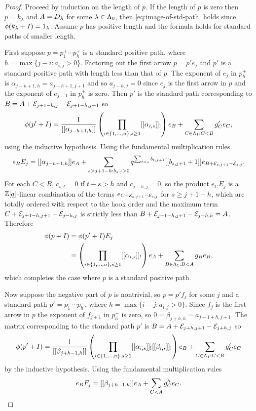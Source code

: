 \documentclass[a4paper, 11pt]{report}
\begin{document}
\begin{proof}
Proceed by induction on the length of $p$. If the length of $p$ is zero then $p=k_\lambda$ and $A=D_{\lambda}$ for some $\lambda\in\Lambda_0{}$, then \ref{eq:image-of-std-path} holds since $\phi(k_\lambda +I)=1_\lambda$. Assume $p$ has positive length and the formula holds for standard paths of smaller length.

First suppose $p=p_1^+\cdots p_h^+$ is a standard positive path, where $h=\max\{j-i:a_{i,j}>0\}$. Factoring out the first arrow $p=p'e_j$ and $p'$ is a standard positive path with length less than that of $p$. The exponent of $e_j$ in $p_h^+$ is $\alpha_{j-h+1,h}=a_{j-h+1,j+1}$ and so $a_{j-h,j}=0$ since $e_j$ is the first arrow in $p$ and the exponent of $e_{j-1}$ in $p_h^+$ is zero. Then $p'$ is the standard path corresponding to $B=A+\mathcal{E}_{j+1-h,j}-\mathcal{E}_{j+1-h,j+1}$ so
\begin{equation*}
\phi(p'+I) = \frac{1}{[[\alpha_{j-h+1,h}]]}\left(\prod_{i\in\{1,\ldots,n\},s\geq 1} [[\alpha_{i,s}]]_!\right) e_B + \sum_{C\in\Lambda_1{}:C<B} g_C'e_C,
\end{equation*}
using the inductive hypothesis. Using the fundamental multiplication rules
\begin{equation*}
e_BE_j = [[\alpha_{j-h+1,h}]]e_A + \sum_{s>j+1-h:b_{s,j}>0} q^{\sum_{t<s}b_{t,j+1}}[[b_{s,j+1}+1]]e_{B+\mathcal{E}_{s,j+1}-\mathcal{E}_{s,j}}.
\end{equation*}
For each $C<B$, $c_{s,t}=0$ if $t-s>h$ and $c_{j-h,j}=0$, so the product $e_CE_j$ is a $\mathbb{Z}[q]$-linear combination of the terms $e_{C+\mathcal{E}_{s,j+1}-\mathcal{E}_{s,j}}$ for $s\geq j+1-h$, which are totally ordered with respect to the hook order and the maximum term $C+\mathcal{E}_{j+1-h,j+1}-\mathcal{E}_{j-h,j}$ is strictly less than $B+\mathcal{E}_{j+1-h,j+1}-\mathcal{E}_{j-h,h}=A$. Therefore
\begin{align*}
\phi(p+I)
&= \phi(p'+I)E_j\\
&= \left(\prod_{i\in\{1,\ldots,n\},s\geq 1} [[\alpha_{i,s}]]_!\right)e_A + \sum_{B\in\Lambda_1{}:B<A} g_Be_B,
\end{align*}
which completes the case where $p$ is a standard positive path.

Now suppose the negative part of $p$ is nontrivial, so $p=p'f_j$ for some $j$ and a standard path $p'=p_1^-\cdots p_h^-$, where $h=\max\{i-j:a_{i,j}>0\}$. Since $f_j$ is the first arrow in $p$ the exponent of $f_{j+1}$ in $p_h^-$ is zero, so $0=\beta_{j+h,h}=a_{j+1+h,j+1}$. The matrix corresponding to the standard path $p'$ is $B=A+\mathcal{E}_{j+h,j+1}-\mathcal{E}_{j+h,j}$ so
\begin{equation*}
\phi(p'+I) = \frac{1}{[[\beta_{j+h-1,h}]]}\left(\prod_{i\in\{1,\ldots,n\},s\geq 1} [[\alpha_{i,s}]]_![[\beta_{i,s}]]_!\right)e_B + \sum_{C\in\Lambda_1{}:C<B} g_C'e_C
\end{equation*}
by the inductive hypothesis. Using the fundamental multiplication rules
\begin{equation*}
e_BF_j = [[\beta_{j+h-1,h}]]e_A + \sum_{C<A} g_C''e_C.
\end{equation*}


\end{proof}
\end{document}
